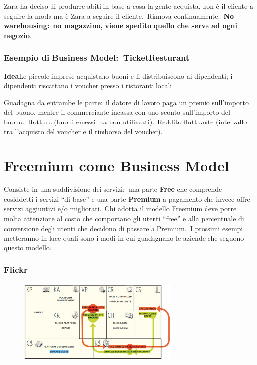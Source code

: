 Zara ha deciso di produrre abiti in base a cosa la gente acquista, non è il cliente a seguire la moda ma è Zara a seguire il cliente.\ Rinnova continuamente.\
\textbf{No warehousing:\ no magazzino, viene spedito quello che serve ad ogni negozio}.\

\subsubsection{Esempio di Business Model:\ TicketResturant}

\textbf{Idea}\quad Le piccole imprese acquistano buoni e li distribuiscono ai dipendenti; i dipendenti riscattano i voucher presso i ristoranti locali
\vspace{12pt}

\noindent Guadagna da entrambe le parte:\
il datore di lavoro paga un premio sull'importo del buono, mentre il commerciante incassa con uno sconto sull'importo del buono.\
Rottura (buoni emessi ma non utilizzati).\
Reddito fluttuante (intervallo tra l'acquisto del voucher e il rimborso del voucher).\

\section{Freemium come Business Model}

Consiste in una suddivisione dei servizi:\ una parte \textbf{Free} che comprende cosiddetti i servizi ``di base'' e una parte \textbf{Premium} a pagamento che invece offre servizi aggiuntivi e/o migliorati.\
Chi adotta il modello Freemium deve porre molta attenzione al costo che comportano gli utenti ``free'' e alla percentuale di conversione degli utenti che decidono di passare a Premium.\
I prossimi esempi metteranno in luce quali sono i modi in cui guadagnano le aziende che seguono questo modello.

\subsubsection{Flickr}

\begin{figure}[H]
    \centering
    \includegraphics[width=0.7\textwidth]{immagini/Flickr.png}
\end{figure}


